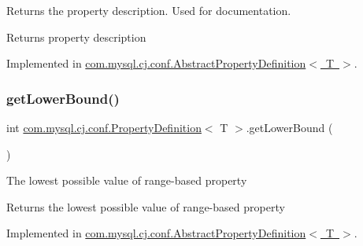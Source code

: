 Returns the property description. Used for documentation.

\begin{DoxyReturn}{Returns}
property description 
\end{DoxyReturn}


Implemented in \mbox{\hyperlink{classcom_1_1mysql_1_1cj_1_1conf_1_1_abstract_property_definition_af4a34d8afb26e311ff0f2290d9189bb5}{com.\+mysql.\+cj.\+conf.\+Abstract\+Property\+Definition$<$ T $>$}}.

\mbox{\label{interfacecom_1_1mysql_1_1cj_1_1conf_1_1_property_definition_aa5c2d6bf96e66cccf887454f038806bc}} 
\subsubsection{\texorpdfstring{get\+Lower\+Bound()}{getLowerBound()}}
{\footnotesize\ttfamily int \mbox{\hyperlink{interfacecom_1_1mysql_1_1cj_1_1conf_1_1_property_definition}{com.\+mysql.\+cj.\+conf.\+Property\+Definition}}$<$ T $>$.get\+Lower\+Bound (\begin{DoxyParamCaption}{ }\end{DoxyParamCaption})}

The lowest possible value of range-\/based property

\begin{DoxyReturn}{Returns}
the lowest possible value of range-\/based property 
\end{DoxyReturn}


Implemented in \mbox{\hyperlink{classcom_1_1mysql_1_1cj_1_1conf_1_1_abstract_property_definition_a834649a1010def340ecfda489b8e4c86}{com.\+mysql.\+cj.\+conf.\+Abstract\+Property\+Definition$<$ T $>$}}.

\mbox{\label{interfacecom_1_1mysql_1_1cj_1_1conf_1_1_property_definition_a3d5fc7338338459e82d187c1255a67af}} 
